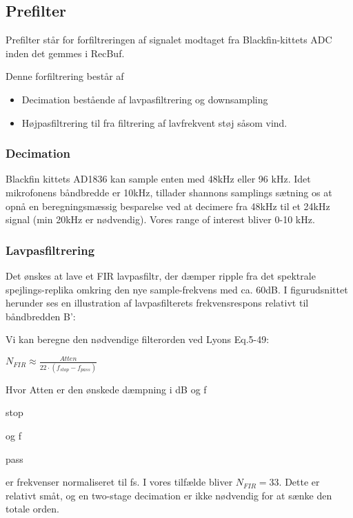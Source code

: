 \subsection{Prefilter}
Prefilter står for forfiltreringen af signalet modtaget fra Blackfin-kittets ADC inden det gemmes i RecBuf.

Denne forfiltrering består af
\begin{itemize}
	\item Decimation bestående af lavpasfiltrering og downsampling
	\item Højpasfiltrering til fra filtrering af lavfrekvent støj såsom vind.
\end{itemize}

\subsubsection{Decimation}
Blackfin kittets AD1836 kan sample enten med 48kHz eller 96 kHz. Idet mikrofonens båndbredde er 10kHz, tillader shannons samplings sætning os at opnå en beregningsmæssig besparelse ved at decimere fra 48kHz til et 24kHz signal (min 20kHz er nødvendig).
Vores range of interest bliver 0-10 kHz.

\subsubsection*{Lavpasfiltrering} 
Det ønskes at lave et FIR lavpasfiltr, der dæmper ripple fra det spektrale spejlings-replika omkring den nye sample-frekvens med ca. 60dB. 
I figurudsnittet herunder ses en illustration af lavpasfilterets frekvensrespons relativt til båndbredden B':

Vi kan beregne den nødvendige filterorden ved Lyons Eq.5-49:
\begin{center}
${ N }_{ FIR }\approx \frac { Atten }{ 22\cdot \left( { f }_{ stop }-{ f }_{ pass } \right)  }$
\end{center}
Hvor Atten er den ønskede dæmpning i dB og f\begin{tiny}stop\end{tiny} og f\begin{tiny}pass\end{tiny} er frekvenser normaliseret til fs. I vores tilfælde bliver ${ N }_{ FIR }=33$. Dette er relativt småt, og en two-stage decimation er ikke nødvendig for at sænke den totale orden.

